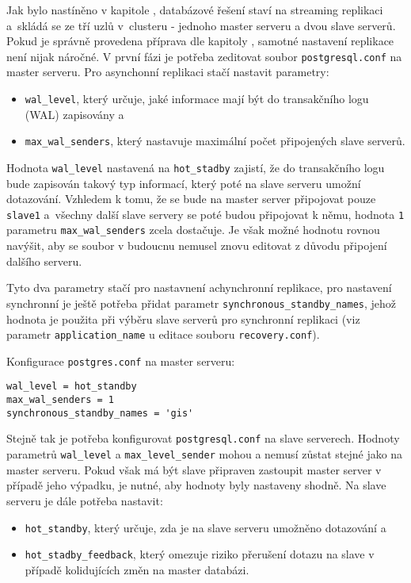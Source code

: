 
Jak bylo nastíněno v kapitole , databázové řešení staví na
streaming replikaci a~skládá se ze tří uzlů v~clusteru - jednoho master serveru a
dvou slave serverů. Pokud je správně provedena příprava dle kapitoly
, samotné nastavení replikace není nijak náročné. V
první fázi je potřeba zeditovat soubor \texttt{postgresql.conf} na master
serveru. Pro asynchonní replikaci stačí nastavit parametry:
\begin{itemize}
  \item \texttt{wal\_level}, který určuje, jaké informace mají být do transakčního
    logu (WAL) zapisovány a
  \item \texttt{max\_wal\_senders}, který nastavuje maximální počet připojených
    slave serverů.
\end{itemize}

Hodnota \texttt{wal\_level} nastavená na \texttt{hot\_stadby} zajistí, že do
transakčního logu bude zapisován takový typ informací, který poté na slave
serveru umožní dotazování. Vzhledem k tomu, že se bude na master
server připojovat pouze \texttt{slave1} a~všechny další slave servery se poté
budou připojovat k němu, hodnota \texttt{1} parametru \texttt{max\_wal\_senders}
zcela dostačuje. Je však možné hodnotu rovnou navýšit, aby se soubor v budoucnu
nemusel znovu editovat z důvodu připojení dalšího serveru.

Tyto dva parametry stačí pro nastavnení achynchronní replikace, pro nastavení
synchronní je ještě potřeba přidat parametr
\texttt{synchronous\_standby\_names}, jehož hodnota je použita při výběru slave
serverů pro synchronní replikaci (viz parametr \texttt{application\_name} u
editace souboru \texttt{recovery.conf}).

Konfigurace \texttt{postgres.conf} na master serveru:
\begin{lstlisting}
wal_level = hot_standby
max_wal_senders = 1
synchronous_standby_names = 'gis'
\end{lstlisting}

Stejně tak je potřeba konfigurovat \texttt{postgresql.conf} na slave serverech.
Hodnoty parametrů \texttt{wal\_level} a \texttt{max\_level\_sender} mohou a
nemusí zůstat stejné jako na master serveru. Pokud však má být slave připraven
zastoupit master server v případě jeho výpadku, je nutné, aby hodnoty byly
nastaveny shodně.  Na slave serveru je dále potřeba nastavit:
\begin{itemize}
  \item\texttt{hot\_standby}, který určuje, zda je na slave serveru umožněno
    dotazování a
  \item\texttt{hot\_stadby\_feedback}, který omezuje riziko přerušení
    dotazu na slave v případě kolidujících změn na master databázi.
\end{itemize}

